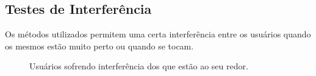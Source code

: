 	
	\subsection{Testes de Interferência}
	
		Os métodos utilizados permitem uma certa interferência entre os usuários
		quando os mesmos estão muito perto ou quando se tocam.

		\begin{figure}[H]
			\begin{center}
			\end{center}
			\caption{Usuários sofrendo interferência dos que estão ao seu redor.}
			\label{fig:testes_relacionamento_com_usuarios}
		\end{figure}